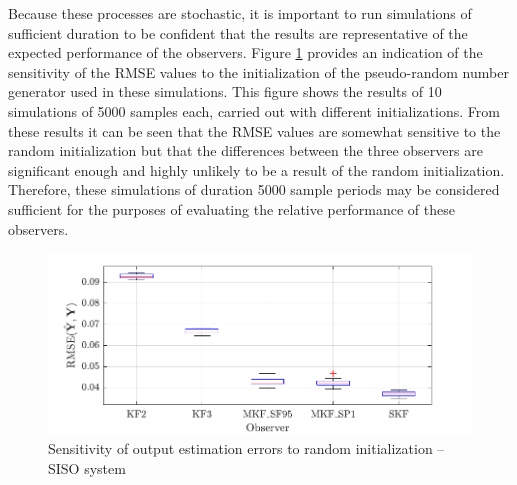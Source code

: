 Because these processes are stochastic, it is important to run simulations of sufficient duration to be confident that the results are representative of the expected performance of the observers. Figure \ref{fig:rod-obs-sim1-yest-all-seed-RMSE-box} provides an indication of the sensitivity of the \gls{RMSE} values to the initialization of the pseudo-random number generator used in these simulations. This figure shows the results of 10 simulations of 5000 samples each, carried out with different initializations. From these results it can be seen that the \gls{RMSE} values are somewhat sensitive to the random initialization but that the differences between the three observers are significant enough and highly unlikely to be a result of the random initialization. Therefore, these simulations of duration 5000 sample periods may be considered sufficient for the purposes of evaluating the relative performance of these observers.
\begin{figure}[htp]
	\centering
	\includegraphics[width=12cm]{images/rod_obs_sim1_all_seed_y_err_box.pdf}
	\caption{Sensitivity of output estimation errors to random initialization – SISO system}
	\label{fig:rod-obs-sim1-yest-all-seed-RMSE-box}
\end{figure}

%
%
%

